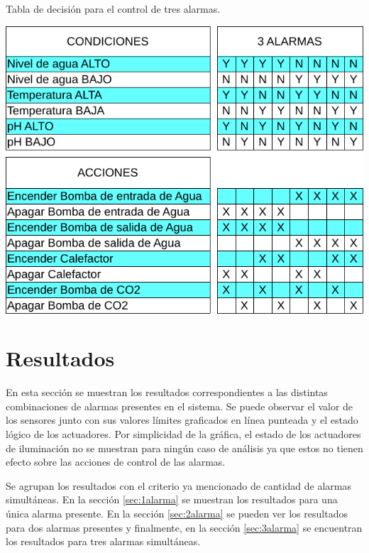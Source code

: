 
\begin{table}[p]
	\centering
	\caption{Tabla de decisión para el control de tres alarmas.}
    \includegraphics[width=.6\textwidth]{./Figures/tabla3alarmas.pdf}
	\label{tab:3alarmas}
\end{table}


\section{Resultados}
\label{sec:Resultados}

En esta sección se muestran los resultados correspondientes a las distintas combinaciones de alarmas presentes en el sistema.  Se puede observar el valor de los sensores junto con sus valores límites graficados en línea punteada y el estado lógico de los actuadores.  Por simplicidad de la gráfica, el estado de los actuadores de iluminación no se muestran para ningún caso de análisis ya que estos no tienen efecto sobre las acciones de control de las alarmas.

Se agrupan los resultados con el criterio ya mencionado de cantidad de alarmas simultáneas.  En la sección \ref{sec:1alarma} se muestran los resultados para una única alarma presente. En la sección \ref{sec:2alarma} se pueden ver los resultados para dos alarmas presentes y finalmente, en la sección \ref{sec:3alarma} se encuentran los resultados para tres alarmas simultáneas.

